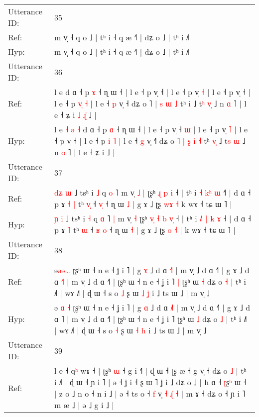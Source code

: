\documentclass[10pt]{article}
\DeclareRobustCommand{\hl}[1]{{\textcolor{red}{#1}}}
\begin{document}
\begin{longtable}{ll}
Utterance ID: & 35 \\
Ref: & m v̩ ˧ q o ˩ | tʰ i ˧ q æ ˧˥ | dʑ o ˩ | tʰ i ˩˥ |
 \\
Hyp: & m v̩ ˧ q o ˩ | tʰ i ˧ q æ ˧˥ | dʑ o ˩ | tʰ i ˩˥ |
 \\
\midrule
Utterance ID: & 36 \\
Ref: & l e\hl{}\hl{}\hl{}\hl{}\hl{}\hl{} d ɑ ˧ p \hl{ɤ} ˧ ɳ ɯ ˧ | l e ˧ p v̩ ˧\hl{}\hl{} | l e ˧ p v̩ \hl{˧} | l e ˧ p v̩ ˧ | l e ˧ p \hl{v}\hl{̩} \hl{˧} | l e ˧ \hl{p} v̩ ˧\hl{} dʑ o ˥ | \hl{s} \hl{ɯ} \hl{˩} tʰ \hl{}\hl{i} ˩ t\hl{ʰ} \hl{v}\hl{̩} ˩ n \hl{ɑ} ˥ | l e ˧ ʑ i\hl{ }\hl{˩}\hl{ }\hl{ɻ}\hl{̍} ˩ |
 \\
Hyp: & l e\hl{ }\hl{˧}\hl{ }\hl{ə}\hl{ }\hl{˧} d ɑ ˧ p \hl{ɑ} ˧ ɳ ɯ ˧ | l e ˧ p v̩ ˧\hl{ }\hl{ɯ} | l e ˧ p v̩ \hl{˥} | l e ˧ p v̩ ˧ | l e ˧ p \hl{}\hl{i} \hl{˥} | l e ˧ \hl{g} v̩ ˧\hl{˥} dʑ o ˥ | \hl{ʂ} \hl{i} \hl{˧} tʰ \hl{v}\hl{̩} ˩ t\hl{s} \hl{}\hl{ɯ} ˩ n \hl{o} ˥ | l e ˧ ʑ i\hl{}\hl{}\hl{}\hl{}\hl{} ˩ |
 \\
\midrule
Utterance ID: & 37 \\
Ref: & \hl{d}\hl{ʑ} \hl{ɯ} ˩ tsʰ i \hl{˩} q \hl{o} ˥\hl{}\hl{} m v̩\hl{ }\hl{˩} \hl{|} ʈʂʰ\hl{}\hl{}\hl{} \hl{ɻ} \hl{p} \hl{}\hl{i} ˧ | tʰ i \hl{}\hl{˧} \hl{}\hl{k}\hl{ʰ} \hl{ɯ} ˧\hl{˥} | d ɑ ˧ p ɤ\hl{ }\hl{˧} \hl{|} tʰ \hl{v}\hl{̩} ˧ \hl{}\hl{v}\hl{̩} ˧ ɳ ɯ \hl{˩} | g ɤ ˩ ʈʂ \hl{}\hl{w}\hl{ɤ} \hl{˧} k wɤ ˧ tɕ ɯ ˥ |
 \\
Hyp: & \hl{}\hl{ɲ} \hl{i} ˩ tsʰ i \hl{˧} q \hl{ɑ} ˥\hl{ }\hl{|} m v̩\hl{}\hl{} \hl{˧} ʈʂʰ\hl{ }\hl{v}\hl{̩} \hl{˧} \hl{b} \hl{v}\hl{̩} ˧ | tʰ i \hl{˩}\hl{˥} \hl{|}\hl{ }\hl{k} \hl{ɤ} ˧\hl{} | d ɑ ˧ p ɤ\hl{}\hl{} \hl{˥} tʰ \hl{}\hl{ɯ} ˧ \hl{ʁ}\hl{ }\hl{o} ˧ ɳ ɯ \hl{˧} | g ɤ ˩ ʈʂ \hl{o}\hl{ }\hl{˧} \hl{|} k wɤ ˧ tɕ ɯ ˥ |
 \\
\midrule
Utterance ID: & 38 \\
Ref: & ə\hl{}\hl{ə}\hl{ə}\hl{…} ʈʂʰ ɯ ˧ n e ˧ ʝ i ˥ | g \hl{ɤ} ˩ d ɑ \hl{˧}˥ | m v̩ ˩ d ɑ ˧˥ | g ɤ ˩ d ɑ \hl{˧}˥ | m v̩ ˩ d ɑ ˧˥ | ʈʂʰ ɯ ˧ n e ˧ ʝ i ˥\hl{ }\hl{|} ʈʂʰ ɯ \hl{˧} dʑ o \hl{˧} | tʰ i ˩˥ | wɤ ˩˥ | ɖ ɯ ˧ s o \hl{˩} ʂ ɯ \hl{˩} \hl{ʝ} i ˩ ts ɯ ˩ | m v̩ ˩
 \\
Hyp: & ə\hl{ }\hl{ɑ}\hl{ }\hl{˧} ʈʂʰ ɯ ˧ n e ˧ ʝ i ˥ | g \hl{ɑ} ˩ d ɑ \hl{˩}˥ | m v̩ ˩ d ɑ ˧˥ | g ɤ ˩ d ɑ \hl{}˥ | m v̩ ˩ d ɑ ˧˥ | ʈʂʰ ɯ ˧ n e ˧ ʝ i ˥\hl{}\hl{} ʈʂʰ ɯ \hl{˩} dʑ o \hl{˩} | tʰ i ˩˥ | wɤ ˩˥ | ɖ ɯ ˧ s o \hl{˧} ʂ ɯ \hl{˧} \hl{h} i ˩ ts ɯ ˩ | m v̩ ˩
 \\
\midrule
Utterance ID: & 39 \\
Ref: & l e ˧ q\hl{ʰ} wɤ ˧ | ʈʂʰ \hl{}\hl{ɯ} ˧ g i ˧\hl{˥} | ɖ ɯ ˧ ʈʂ æ ˧ g v̩ ˧ dʑ o \hl{˩} | tʰ i ˩˥ | ɖ ɯ ˧ ɲ i ˥ | ə ˧ ʝ i ˧ ʂ ɯ ˥ ʝ i ˩ dʑ o ˩ | h ɑ ˧ \hl{ʈ}ʂ\hl{ʰ} ɯ ˧ | z o ˩ n o ˧ n i ˩ | ə ˧ ts o ˧ \hl{f} v̩\hl{}\hl{} \hl{˧} \hl{ɻ}\hl{̍} \hl{˧} | m ɤ ˧ dʑ o ˧ ɲ i ˥ m æ ˩ | ə ˩ g i ˩ |

\end{longtable}
\end{document}
